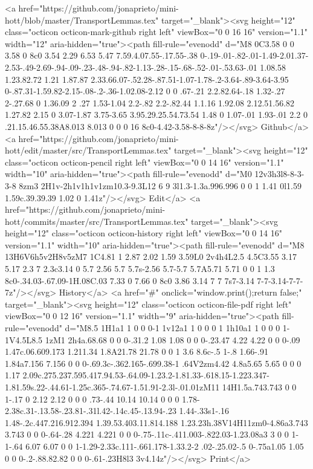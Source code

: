 {{      <a href="https://github.com/jonaprieto/mini-hott/blob/master/TransportLemmas.tex" target="_blank"><svg height="12" class="octicon octicon-mark-github right left" viewBox="0 0 16 16" version="1.1" width="12" aria-hidden="true"><path fill-rule="evenodd" d="M8 0C3.58 0 0 3.58 0 8c0 3.54 2.29 6.53 5.47 7.59.4.07.55-.17.55-.38 0-.19-.01-.82-.01-1.49-2.01.37-2.53-.49-2.69-.94-.09-.23-.48-.94-.82-1.13-.28-.15-.68-.52-.01-.53.63-.01 1.08.58 1.23.82.72 1.21 1.87.87 2.33.66.07-.52.28-.87.51-1.07-1.78-.2-3.64-.89-3.64-3.95 0-.87.31-1.59.82-2.15-.08-.2-.36-1.02.08-2.12 0 0 .67-.21 2.2.82.64-.18 1.32-.27 2-.27.68 0 1.36.09 2 .27 1.53-1.04 2.2-.82 2.2-.82.44 1.1.16 1.92.08 2.12.51.56.82 1.27.82 2.15 0 3.07-1.87 3.75-3.65 3.95.29.25.54.73.54 1.48 0 1.07-.01 1.93-.01 2.2 0 .21.15.46.55.38A8.013 8.013 0 0 0 16 8c0-4.42-3.58-8-8-8z"/></svg> Github</a>
      <a href="https://github.com/jonaprieto/mini-hott/edit/master/src/TransportLemmas.tex" target="_blank"><svg height="12" class="octicon octicon-pencil right left" viewBox="0 0 14 16" version="1.1" width="10" aria-hidden="true"><path fill-rule="evenodd" d="M0 12v3h3l8-8-3-3-8 8zm3 2H1v-2h1v1h1v1zm10.3-9.3L12 6 9 3l1.3-1.3a.996.996 0 0 1 1.41 0l1.59 1.59c.39.39.39 1.02 0 1.41z"/></svg> Edit</a>
      <a href="https://github.com/jonaprieto/mini-hott/commits/master/src/TransportLemmas.tex" target="_blank"><svg height="12" class="octicon octicon-history right left" viewBox="0 0 14 16" version="1.1" width="10" aria-hidden="true"><path fill-rule="evenodd" d="M8 13H6V6h5v2H8v5zM7 1C4.81 1 2.87 2.02 1.59 3.59L0 2v4h4L2.5 4.5C3.55 3.17 5.17 2.3 7 2.3c3.14 0 5.7 2.56 5.7 5.7s-2.56 5.7-5.7 5.7A5.71 5.71 0 0 1 1.3 8c0-.34.03-.67.09-1H.08C.03 7.33 0 7.66 0 8c0 3.86 3.14 7 7 7s7-3.14 7-7-3.14-7-7-7z"/></svg> History</a>
      <a  href="#" onclick="window.print();return false;" target="_blank"><svg height="12" class="octicon octicon-file-pdf right left" viewBox="0 0 12 16" version="1.1" width="9" aria-hidden="true"><path fill-rule="evenodd" d="M8.5 1H1a1 1 0 0 0-1 1v12a1 1 0 0 0 1 1h10a1 1 0 0 0 1-1V4.5L8.5 1zM1 2h4a.68.68 0 0 0-.31.2 1.08 1.08 0 0 0-.23.47 4.22 4.22 0 0 0-.09 1.47c.06.609.173 1.211.34 1.8A21.78 21.78 0 0 1 3.6 8.6c-.5 1-.8 1.66-.91 1.84a7.156 7.156 0 0 0-.69.3c-.362.165-.699.38-1 .64V2zm4.42 4.8a5.65 5.65 0 0 0 1.17 2.09c.275.237.595.417.94.53-.64.09-1.23.2-1.81.33-.618.15-1.223.347-1.81.59s.22-.44.61-1.25c.365-.74.67-1.51.91-2.3l-.01.01zM11 14H1.5a.743.743 0 0 1-.17 0 2.12 2.12 0 0 0 .73-.44 10.14 10.14 0 0 0 1.78-2.38c.31-.13.58-.23.81-.31l.42-.14c.45-.13.94-.23 1.44-.33s1-.16 1.48-.2c.447.216.912.394 1.39.53.403.11.814.188 1.23.23h.38V14H11zm0-4.86a3.743 3.743 0 0 0-.64-.28 4.221 4.221 0 0 0-.75-.11c-.411.003-.822.03-1.23.08a3 3 0 0 1-1-.64 6.07 6.07 0 0 1-1.29-2.33c.111-.661.178-1.33.2-2 .02-.25.02-.5 0-.75a1.05 1.05 0 0 0-.2-.88.82.82 0 0 0-.61-.23H8l3 3v4.14z"/></svg> Print</a>
}}
